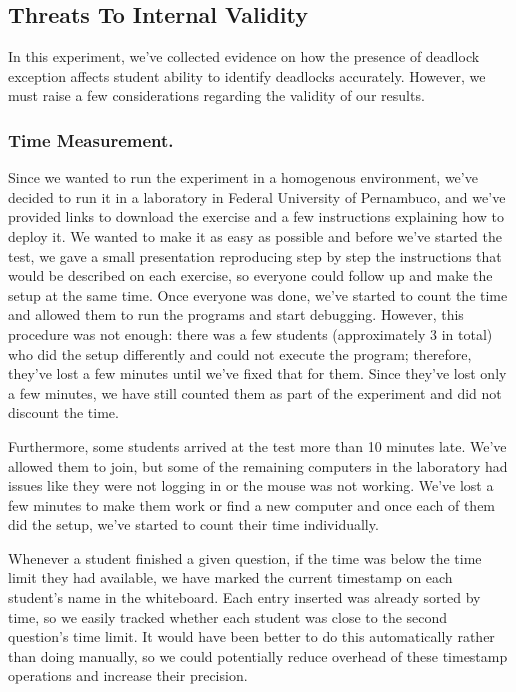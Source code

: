 \subsection{Threats To Internal Validity}

In this experiment, we've collected evidence on how the presence of deadlock exception affects student ability to identify deadlocks accurately. However, we must raise a few considerations regarding the validity of our results.

\subsubsection{Time Measurement.}

Since we wanted to run the experiment in a homogenous environment, we've decided to run it in a laboratory in Federal University of Pernambuco, and we've provided links to download the exercise and a few instructions explaining how to deploy it. We wanted to make it as easy as possible and before we've started the test, we gave a small presentation reproducing step by step the instructions that would be described on each exercise, so everyone could follow up and make the setup at the same time. Once everyone was done, we've started to count the time and allowed them to run the programs and start debugging. However, this procedure was not enough: there was a few students (approximately 3 in total) who did the setup differently and could not execute the program; therefore, they've lost a few minutes until we've fixed that for them. Since they've lost only a few minutes, we have still counted them as part of the experiment and did not discount the time.

Furthermore, some students arrived at the test more than 10 minutes late. We've allowed them to join, but some of the remaining computers in the laboratory had issues like they were not logging in or the mouse was not working. We've lost a few minutes to make them work or find a new computer and once each of them did the setup, we've started to count their time individually.

Whenever a student finished a given question, if the time was below the time limit they had available, we have marked the current timestamp on each student's name in the whiteboard. Each entry inserted was already sorted by time, so we easily tracked whether each student was close to the second question's time limit. It would have been better to do this automatically rather than doing manually, so we could potentially reduce overhead of these timestamp operations and increase their precision.

